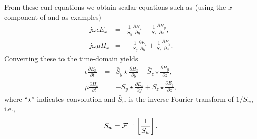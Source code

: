 From these curl equations we obtain scalar equations such as (using
the $x$-component of  and
 as examples)
\begin{eqnarray}
  j\omega\epsilon E_x &=& 
    \frac{1}{S_y}\frac{\partial H_z}{\partial y} - 
    \frac{1}{S_z}\frac{\partial H_y}{\partial z}, \\
  j\omega\mu H_x &=& 
    -\frac{1}{S_y}\frac{\partial E_z}{\partial y} +
    \frac{1}{S_z}\frac{\partial E_y}{\partial z}.
\end{eqnarray}
Converting these to the time-domain yields
\begin{eqnarray}
  \epsilon \frac{\partial E_x}{\partial t} &=& 
    \bar{S}_y \star \frac{\partial H_z}{\partial y} - 
    \bar{S}_z \star \frac{\partial H_y}{\partial z}, 
  \label{eq:exConvolution}
  \\
  \mu \frac{\partial H_x}{\partial t} &=& 
    -\bar{S}_y \star \frac{\partial E_z}{\partial y} +
    \bar{S}_z \star \frac{\partial E_y}{\partial z},
\end{eqnarray}
where ``$\star$'' indicates convolution and $\bar{S}_w$ is the inverse
Fourier transform of $1/S_w$, i.e.,
\begin{equation}
  \bar{S}_w = {\cal F}^{-1}\left[\frac{1}{S_w}\right].
\end{equation}

